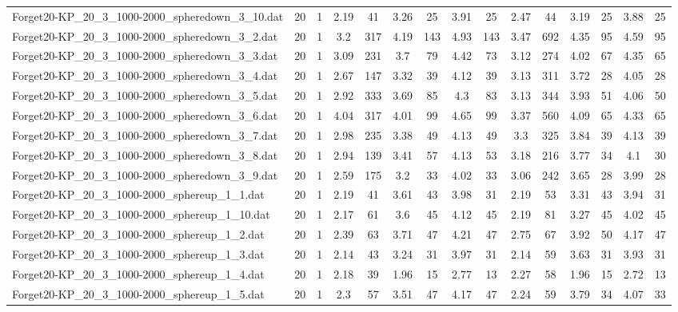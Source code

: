 \begin{table}[!ht]
{\begin{tabular}{lcccccccccccccc}
Forget20-KP\_20\_3\_1000-2000\_spheredown\_3\_10.dat & 20 & 1 & 2.19 & 41 & 3.26 & 25 & 3.91 & 25 & 2.47 & 44 & 3.19 & 25 & 3.88 & 25 \\
Forget20-KP\_20\_3\_1000-2000\_spheredown\_3\_2.dat & 20 & 1 & 3.2 & 317 & 4.19 & 143 & 4.93 & 143 & 3.47 & 692 & 4.35 & 95 & 4.59 & 95 \\
Forget20-KP\_20\_3\_1000-2000\_spheredown\_3\_3.dat & 20 & 1 & 3.09 & 231 & 3.7 & 79 & 4.42 & 73 & 3.12 & 274 & 4.02 & 67 & 4.35 & 65 \\
Forget20-KP\_20\_3\_1000-2000\_spheredown\_3\_4.dat & 20 & 1 & 2.67 & 147 & 3.32 & 39 & 4.12 & 39 & 3.13 & 311 & 3.72 & 28 & 4.05 & 28 \\
Forget20-KP\_20\_3\_1000-2000\_spheredown\_3\_5.dat & 20 & 1 & 2.92 & 333 & 3.69 & 85 & 4.3 & 83 & 3.13 & 344 & 3.93 & 51 & 4.06 & 50 \\
Forget20-KP\_20\_3\_1000-2000\_spheredown\_3\_6.dat & 20 & 1 & 4.04 & 317 & 4.01 & 99 & 4.65 & 99 & 3.37 & 560 & 4.09 & 65 & 4.33 & 65 \\
Forget20-KP\_20\_3\_1000-2000\_spheredown\_3\_7.dat & 20 & 1 & 2.98 & 235 & 3.38 & 49 & 4.13 & 49 & 3.3 & 325 & 3.84 & 39 & 4.13 & 39 \\
Forget20-KP\_20\_3\_1000-2000\_spheredown\_3\_8.dat & 20 & 1 & 2.94 & 139 & 3.41 & 57 & 4.13 & 53 & 3.18 & 216 & 3.77 & 34 & 4.1 & 30 \\
Forget20-KP\_20\_3\_1000-2000\_spheredown\_3\_9.dat & 20 & 1 & 2.59 & 175 & 3.2 & 33 & 4.02 & 33 & 3.06 & 242 & 3.65 & 28 & 3.99 & 28 \\
Forget20-KP\_20\_3\_1000-2000\_sphereup\_1\_1.dat & 20 & 1 & 2.19 & 41 & 3.61 & 43 & 3.98 & 31 & 2.19 & 53 & 3.31 & 43 & 3.94 & 31 \\
Forget20-KP\_20\_3\_1000-2000\_sphereup\_1\_10.dat & 20 & 1 & 2.17 & 61 & 3.6 & 45 & 4.12 & 45 & 2.19 & 81 & 3.27 & 45 & 4.02 & 45 \\
Forget20-KP\_20\_3\_1000-2000\_sphereup\_1\_2.dat & 20 & 1 & 2.39 & 63 & 3.71 & 47 & 4.21 & 47 & 2.75 & 67 & 3.92 & 50 & 4.17 & 47 \\
Forget20-KP\_20\_3\_1000-2000\_sphereup\_1\_3.dat & 20 & 1 & 2.14 & 43 & 3.24 & 31 & 3.97 & 31 & 2.14 & 59 & 3.63 & 31 & 3.93 & 31 \\
Forget20-KP\_20\_3\_1000-2000\_sphereup\_1\_4.dat & 20 & 1 & 2.18 & 39 & 1.96 & 15 & 2.77 & 13 & 2.27 & 58 & 1.96 & 15 & 2.72 & 13 \\
Forget20-KP\_20\_3\_1000-2000\_sphereup\_1\_5.dat & 20 & 1 & 2.3 & 57 & 3.51 & 47 & 4.17 & 47 & 2.24 & 59 & 3.79 & 34 & 4.07 & 33 \\

\end{tabular}}
\end{table}
